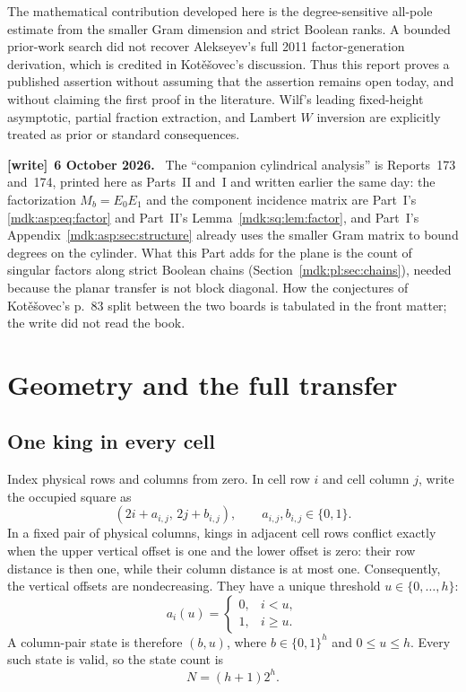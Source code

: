 \documentclass[11pt,letterpaper]{article}
\numberwithin{equation}{section}
\theoremstyle{remark}\newtheorem{remark}[theorem]{Remark}
\newenvironment{writenote}[1][]{\par\smallskip\begingroup\small
 \noindent\textbf{[write]}\if\relax\detokenize{#1}\relax\else~\textbf{#1.}\fi\ }%
 {\par\endgroup\smallskip}
\begin{document}
The mathematical contribution developed here is the degree-sensitive all-pole estimate from the smaller Gram dimension and strict Boolean ranks. A bounded prior-work search did not recover Alekseyev's full 2011 factor-generation derivation, which is credited in Kot\v e\v sovec's discussion. Thus this report proves a published assertion without assuming that the assertion remains open today, and without claiming the first proof in the literature. Wilf's leading fixed-height asymptotic, partial fraction extraction, and Lambert $W$ inversion are explicitly treated as prior or standard consequences.
\begin{writenote}[6 October 2026]
The ``companion cylindrical analysis'' is Reports~173 and~174, printed here as Parts~II and~I and written earlier the same day: the factorization $M_b=E_0E_1$ and the component incidence matrix are Part~I's \eqref{mdk:asp:eq:factor} and Part~II's Lemma~\ref{mdk:sq:lem:factor}, and Part~I's Appendix~\ref{mdk:asp:sec:structure} already uses the smaller Gram matrix to bound degrees on the cylinder. What this Part adds for the plane is the count of singular factors along strict Boolean chains (Section~\ref{mdk:pl:sec:chains}), needed because the planar transfer is not block diagonal. How the conjectures of Kot\v e\v sovec's p.~83 split between the two boards is tabulated in the front matter; the write did not read the book.
\end{writenote}

\section{Geometry and the full transfer}\label{mdk:pl:sec:transfer}
\subsection{One king in every cell}
Index physical rows and columns from zero. In cell row $i$ and cell column $j$, write the occupied square as
\[
 (2i+a_{i,j},\,2j+b_{i,j}),\qquad a_{i,j},b_{i,j}\in\{0,1\}.
\]
In a fixed pair of physical columns, kings in adjacent cell rows conflict exactly when the upper vertical offset is one and the lower offset is zero: their row distance is then one, while their column distance is at most one. Consequently, the vertical offsets are nondecreasing. They have a unique threshold $u\in\{0,\ldots,h\}$:
\begin{equation}\label{mdk:pl:eq:threshold}
 a_i(u)=\begin{cases}0,&i<u,\\1,&i\ge u.\end{cases}
\end{equation}
A column-pair state is therefore $(b,u)$, where $b\in\{0,1\}^h$ and $0\le u\le h$. Every such state is valid, so the state count is
\[
 N=(h+1)2^h.
\]
\end{document}
